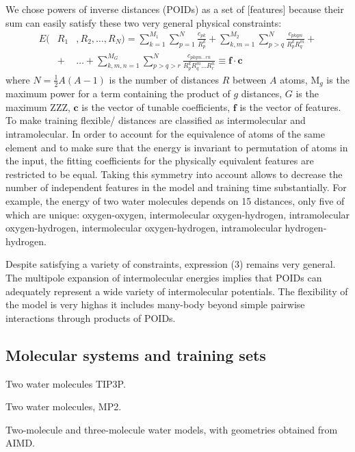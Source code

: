 \documentclass[aps,prl,reprint,amsmath,amssymb,nature]{revtex4-1}
\begin{document}
We chose powers of inverse distances (POIDs) as a set of [features] because their sum can easily satisfy these two very general physical constraints:
\begin{eqnarray}
E (&R_1&, R_2, \ldots, R_N) = \sum_{k=1}^{M_1} \sum_{p=1}^{N} \frac{c_{pk}}{R_p^k} + \sum_{k,m=1}^{M_2} \sum_{p>q}^{N} \frac{c_{pkqm}}{R_p^k R_q^m} + \nonumber \\
&+& \ldots +\sum_{k,m,n=1}^{M_G} \sum_{p>q>r}^{N} \frac{c_{pkqm\ldots rn}}{R_p^k R_q^m \ldots R_r^n} \equiv \mathbf{f}\cdot \mathbf{c}
\end{eqnarray}
%
where $N = \frac{1}{2}A(A-1)$ is the number of distances $R$ between $A$ atoms, M$_{g}$ is the maximum power for a term containing the product of $g$ distances, $G$ is the maximum ZZZ, $\mathbf{c}$ is the vector of tunable coefficients, $\mathbf{f}$ is the vector of features. 
\red To make training flexible/ distances are classified as intermolecular and intramolecular. \old 
In order to account for the equivalence of atoms of the same element and to make sure that the energy is invariant to permutation of atoms in the input, the fitting coefficients for the physically equivalent features are restricted to be equal. 
Taking this symmetry into account allows to decrease the number of independent features in the model and training time substantially. 
For example, the energy of two water molecules depends on 15 distances, only five of which are unique: oxygen-oxygen, intermolecular oxygen-hydrogen, intramolecular oxygen-hydrogen, intermolecular oxygen-hydrogen, intramolecular hydrogen-hydrogen.

Despite satisfying a variety of constraints, expression (3) remains very general. 
The multipole expansion of intermolecular energies implies that POIDs can adequately represent a wide variety of intermolecular potentials. 
The flexibility of the model \red is very high\old as it includes many-body beyond simple pairwise interactions through products 
of POIDs.

\subsection{Molecular systems and training sets} 


Two water molecules TIP3P.

Two water molecules, MP2.

Two-molecule and three-molecule water models, with geometries obtained 
from AIMD.
\end{document}
